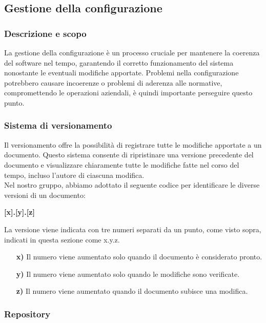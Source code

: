 \documentclass{article}
\begin{document}
\subsection{Gestione della configurazione}
    \subsubsection{Descrizione e scopo}
    La gestione della configurazione è un processo cruciale per mantenere la coerenza del software nel tempo, garantendo il corretto funzionamento del sistema nonostante le eventuali modifiche apportate. Problemi nella configurazione potrebbero causare incoerenze o problemi di aderenza alle normative, compromettendo le operazioni aziendali, è quindi importante perseguire questo punto.
    
    \subsubsection{Sistema di versionamento}
    Il versionamento offre la possibilità di registrare tutte le modifiche apportate a un documento. Questo sistema consente di ripristinare una versione precedente del documento e visualizzare chiaramente tutte le modifiche fatte nel corso del tempo, incluso l'autore di ciascuna modifica.\\
    Nel nostro gruppo, abbiamo adottato il seguente codice per identificare le diverse versioni di un documento:
    \begin{center}
    \textbf{[x].[y].[z]}
    \end{center}
    La versione viene indicata con tre numeri separati da un punto, come visto sopra, indicati in questa sezione come x.y.z.
    \begin{itemize}
    \item[\textbf{x)}] Il numero viene aumentato solo quando il documento è considerato pronto.
    \item[\textbf{y)}] Il numero viene aumentato solo quando le modifiche sono verificate.
    \item[\textbf{z)}] Il numero viene aumentato quando il documento subisce una modifica.
    \end{itemize}  
    
    \subsubsection{Repository}
\end{document}
